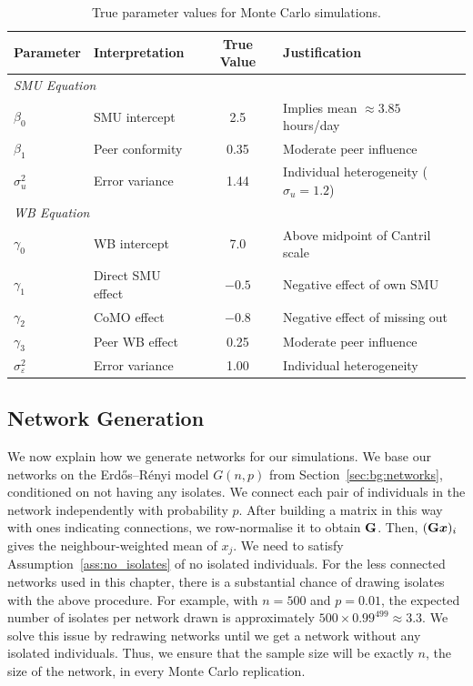 \begin{table}[htbp]
\centering
\caption[True parameter values for Monte Carlo simulations]{True parameter values for Monte Carlo simulations.}
\label{tab:mc_true_params}
\begin{tabular}{llcl}
\toprule
Parameter & Interpretation & True Value & Justification \\
\midrule
\multicolumn{4}{l}{\textit{SMU Equation}} \\
$\beta_0$ & SMU intercept & 2.5 & Implies mean $\approx 3.85$ hours/day \\
$\beta_1$ & Peer conformity & 0.35 & Moderate peer influence \\
$\sigma_u^2$ & Error variance & 1.44 & Individual heterogeneity ($\sigma_u = 1.2$) \\
\midrule
\multicolumn{4}{l}{\textit{WB Equation}} \\
$\gamma_0$ & WB intercept & 7.0 & Above midpoint of Cantril scale \\
$\gamma_1$ & Direct SMU effect & $-0.5$ & Negative effect of own SMU \\
$\gamma_2$ & CoMO effect & $-0.8$ & Negative effect of missing out \\
$\gamma_3$ & Peer WB effect & 0.25 & Moderate peer influence \\
$\sigma_\varepsilon^2$ & Error variance & 1.00 & Individual heterogeneity \\
\bottomrule
\end{tabular}
\end{table}

\subsection{Network Generation}
\label{sec:mc:network}
We now explain how we generate networks for our simulations. We base our networks on the Erd\H{o}s--R\'enyi model $G(n, p)$ from Section~\ref{sec:bg:networks}, conditioned on not having any isolates. We connect each pair of individuals in the network independently with probability $p$. After building a matrix in this way with ones indicating connections, we row-normalise it to obtain $\mathbf{G}$. Then, $(\mathbf{G}\bm{x})_i$ gives the neighbour-weighted mean of $x_j$. We need to satisfy Assumption~\ref{ass:no_isolates} of no isolated individuals. For the less connected networks used in this chapter, there is a substantial chance of drawing isolates with the above procedure. For example, with $n = 500$ and $p = 0.01$, the expected number of isolates per network drawn is approximately $500 \times 0.99^{499} \approx 3.3$. We solve this issue by redrawing networks until we get a network without any isolated individuals. Thus, we ensure that the sample size will be exactly $n$, the size of the network, in every Monte Carlo replication.

